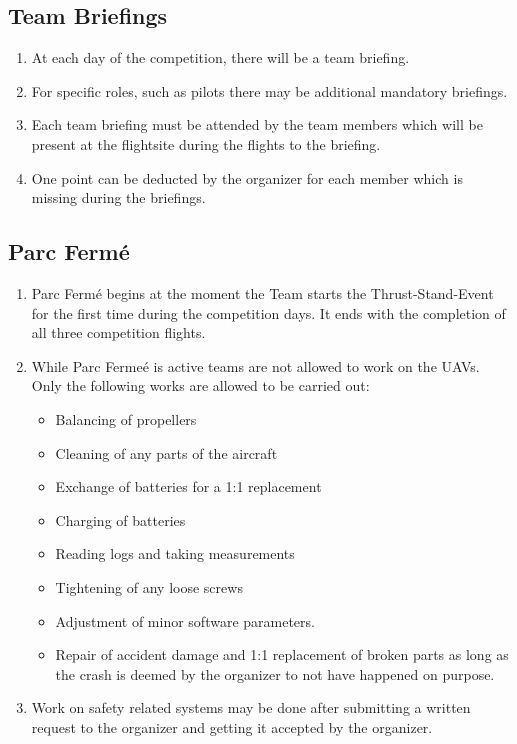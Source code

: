     \subsection{Team Briefings}
    \begin{enumerate}
      \item At each day of the competition, there will be a team briefing.
      \item For specific roles, such as pilots there may be additional mandatory briefings.
      \item Each team briefing must be attended by the team members which will be present at the flightsite during the flights to the briefing.
      \item One point can be deducted by the organizer for each member which is missing during the briefings.
    \end{enumerate}

    \subsection{Parc Fermé}
    \begin{enumerate}
      \item Parc Fermé begins at the moment the Team starts the Thrust-Stand-Event for the first time during the competition days. It ends with the completion of all three competition flights. 
      \item While Parc Fermeé is active teams are not allowed to work on the UAVs. Only the following works are allowed to be carried out: 
      \begin{itemize}
        \item Balancing of propellers
        \item Cleaning of any parts of the aircraft
        \item Exchange of batteries for a 1:1 replacement
        \item Charging of batteries 
        \item Reading logs and taking measurements
        \item Tightening of any loose screws
        \item Adjustment of minor software parameters. 
        \item Repair of accident damage and 1:1 replacement of broken parts as long as the crash is deemed by the organizer to not have happened on purpose. 
      \end{itemize}
      \item Work on safety related systems may be done after submitting a written request to the organizer and getting it accepted by the organizer. 
    \end{enumerate}

